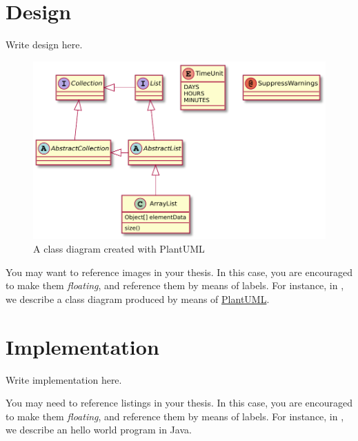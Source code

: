 \documentclass[12pt,a4paper,openright,twoside]{book}
\begin{document}
\chapter{Design} %
\label{chap:design}

Write design here.

\begin{figure}
	\centering
	\includegraphics[width=0.5\linewidth]{figures/classes.pdf}
	\caption{A class diagram created with PlantUML}
	\label{fig:classes}
\end{figure}

You may want to reference images in your thesis.
%
In this case, you are encouraged to make them \emph{floating}, and reference them by means of labels.
%
For instance, in , we describe a class diagram produced by means of \href{http://plantuml.com}{PlantUML}.

\chapter{Implementation} %
\label{chap:implementation}

Write implementation here.



You may need to reference listings in your thesis.
%
In this case, you are encouraged to make them \emph{floating}, and reference them by means of labels.
%
For instance, in , we describe an hello world program in Java.

\end{document}
